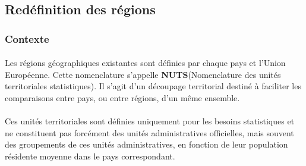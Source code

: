 \subsection{Redéfinition des régions}
\subsubsection{Contexte}
\paragraph{}
\vspace{-2em}
Les régions géographiques existantes sont définies par chaque pays et l'Union Européenne. 
Cette nomenclature s'appelle \textbf{NUTS}(Nomenclature des unités territoriales statistiques). Il s'agit d'un découpage territorial destiné à faciliter les comparaisons entre pays, ou entre régions, d'un même ensemble.
\paragraph{}
\vspace{-2em}
Ces unités territoriales sont définies uniquement pour les besoins statistiques et ne constituent pas forcément des unités administratives officielles, mais souvent des groupements de ces unités administratives, en fonction de leur population résidente moyenne dans le pays correspondant.
